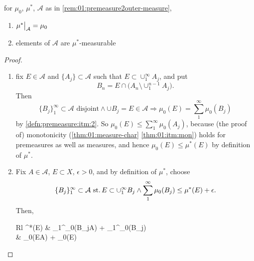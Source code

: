 \begin{prop}\label{prop:1.13}\label{prop:01:premeasure-measurable}
  for $\mu_0$, $\mu^*$, $\mathcal{A}$
  as in \ref{rem:01:premeasure2outer-measure},
  \begin{enumerate}[label=(\alph*)]
  \item\label{prop:01:itm:premeasure-eq-outer-measure}
    ${\restr{\mu^*}{\mathcal{A}} = \mu_0}$
  \item\label{prop:01:itm:premeasure-measurable}
    elements of $\mathcal{A}$ are $\mu^*$-measurable
  \end{enumerate}
\end{prop}
\begin{proof}\
  \begin{enumerate}[label=(\alph*)]
  \item
    fix ${E\in\mathcal{A}}$ and
    ${\{A_j\}\subset\mathcal{A}}$ such that
    ${E\subset \cup_1^\infty A_j}$, and put
    \[ B_n=E\cap\big(A_n \setminus \cup_1^{n-1} A_j\big). \]
    Then
    \[
    \{B_j\}_1^\infty\subset\mathcal{A}\text{ disjoint}
    \land
    \cup B_j = E \in \mathcal{A}
    \Rightarrow
    \mu_0(E) = \sum_1^\infty \mu_0(B_j)
    \]
    by \ref{defn:premeasure:itm:2}.  So
    ${\mu_0(E)\leq\sum_1^\infty \mu_0(A_j)}$,
    because (the proof of) monotonicity
    (\ref{thm:01:measure-char} \ref{thm:01:itm:mon})
    holds for premeasures as well as measures, and hence
    ${\mu_0(E)\leq\mu^*(E)}$ by definition of $\mu^*$.
  \item
    Fix ${A\in\mathcal{A}}$, ${E\subset X}$, ${\epsilon>0}$, and
    by definition of $\mu^*$, choose
    \[
    \{B_j\}_1^\infty \subset\mathcal{A}
    \operatorname{\,st.} E\subset\cup_1^\infty B_j \land
    \sum_1^\infty \mu_0(B_j)\leq \mu^*(E) + \epsilon .
    \]
    Then,
    \begin{IEEEeqnarray*}{Rl}
    \mu^*(E) \stackrel{\dag}{\geq} &
    \sum_1^\infty \mu_0(B_j\cap A) + \sum_1^\infty \mu_0(B_j) \\
    \stackrel{\ddag}{\geq} &
    \mu_0(E\cap A) + \mu_0(E\cap{})
    \end{IEEEeqnarray*}
  \end{enumerate}
\end{proof}

